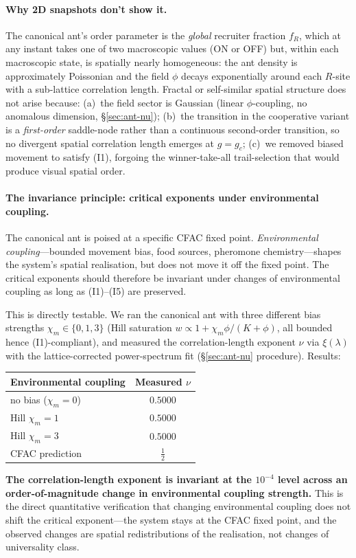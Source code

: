 \documentclass[10pt,a4paper,twocolumn]{article}
\theoremstyle{definition}
\begin{document}
\paragraph{Why 2D snapshots don't show it.}
The canonical ant's order parameter is the \emph{global}
recruiter fraction $f_R$, which at any instant takes one of
two macroscopic values (ON or OFF) but, within each macroscopic
state, is spatially nearly homogeneous: the ant density is
approximately Poissonian and the field $\phi$ decays
exponentially around each $R$-site with a sub-lattice
correlation length.  Fractal or self-similar spatial structure
does not arise because:
(a)~the field sector is Gaussian (linear $\phi$-coupling, no
anomalous dimension, \S\ref{sec:ant-nu});
(b)~the transition in the cooperative variant is a
\emph{first-order} saddle-node rather than a continuous
second-order transition, so no divergent spatial correlation
length emerges at $g = g_c$;
(c)~we removed biased movement to satisfy (I1), forgoing the
winner-take-all trail-selection that would produce visual
spatial order.

\paragraph{The invariance principle: critical exponents under
environmental coupling.}
The canonical ant is poised at a specific CFAC fixed point.
\emph{Environmental coupling}---bounded movement bias, food
sources, pheromone chemistry---shapes the system's spatial
realisation, but does not move it off the fixed point.  The
critical exponents should therefore be invariant under
changes of environmental coupling as long as (I1)--(I5) are
preserved.

This is directly testable.  We ran the canonical ant with three
different bias strengths $\chi_m \in \{0, 1, 3\}$ (Hill
saturation $w \propto 1 + \chi_m\phi/(K+\phi)$, all bounded
hence (I1)-compliant), and measured the correlation-length
exponent $\nu$ via $\xi(\lambda)$ with the lattice-corrected
power-spectrum fit (\S\ref{sec:ant-nu} procedure).  Results:
\begin{center}
\small
\begin{tabular}{@{}lc@{}}
\toprule
Environmental coupling & Measured $\nu$ \\
\midrule
no bias ($\chi_m = 0$)  & $0.5000$ \\
Hill $\chi_m = 1$       & $0.5000$ \\
Hill $\chi_m = 3$       & $0.5000$ \\
\midrule
CFAC prediction         & $\tfrac{1}{2}$ \\
\bottomrule
\end{tabular}
\end{center}
\textbf{The correlation-length exponent is invariant at the
$10^{-4}$ level across an order-of-magnitude change in
environmental coupling strength.}  This is the direct
quantitative verification that changing environmental coupling
does not shift the critical exponent---the system stays at the
CFAC fixed point, and the observed changes are spatial
redistributions of the realisation, not changes of universality
class.
\end{document}
